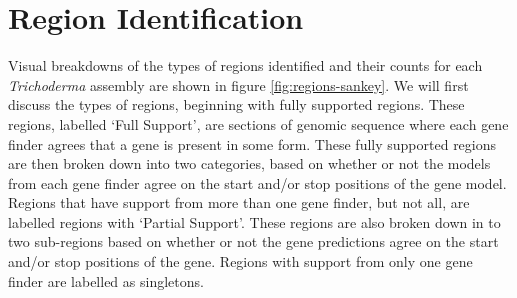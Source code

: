 \section{Region Identification}

Visual breakdowns of the types of regions identified and their counts
for each \textit{Trichoderma} assembly are shown in figure
\ref{fig:regions-sankey}. We will first discuss the types of regions,
beginning with fully supported regions. These regions, labelled `Full
Support', are sections of genomic sequence where each gene finder
agrees that a gene is present in some form. These fully supported
regions are then broken down into two categories, based on whether or
not the models from each gene finder agree on the start and/or stop
positions of the gene model. Regions that have support from more than
one gene finder, but not all, are labelled regions with `Partial
Support'. These regions are also broken down in to two sub-regions
based on whether or not the gene predictions agree on the start and/or
stop positions of the gene. Regions with support from only one gene
finder are labelled as singletons.


